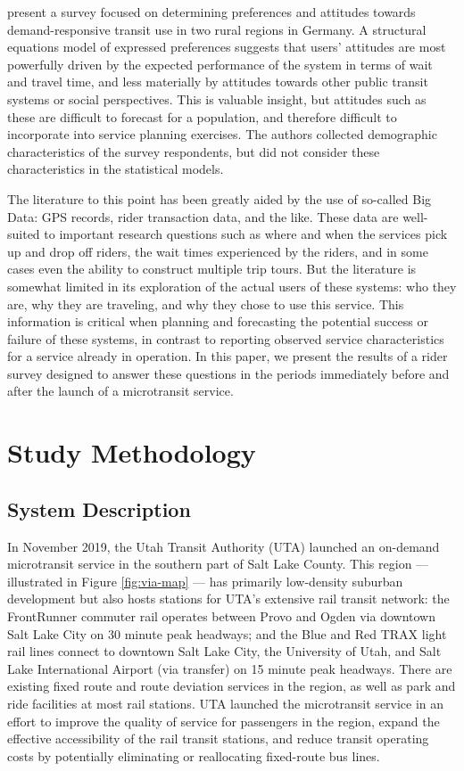 \documentclass[smartcities,article,submit,moreauthors,pdftex]{Definitions/mdpi}
\begin{document}
\citet{KONIG2020954} present a survey focused on determining preferences and attitudes towards demand-responsive transit use in two rural regions in Germany. A structural equations model of expressed preferences suggests that users' attitudes are most powerfully driven by the expected performance of the system in terms of wait and travel time, and less materially by attitudes towards other public transit systems or social perspectives. This is valuable insight, but attitudes such as these are difficult to forecast for a population, and therefore difficult to incorporate into service planning exercises. The authors collected demographic characteristics of the survey respondents, but did not consider these characteristics in the statistical models.

The literature to this point has been greatly aided by the use of so-called Big Data: GPS records, rider transaction data, and the like. These data are well-suited to important research questions such as where and when the services pick up and drop off riders, the wait times experienced by the riders, and in some cases even the ability to construct multiple trip tours. But the literature is somewhat limited in its exploration of the actual users of these systems: who they are, why they are traveling, and why they chose to use this service. This information is critical when planning and forecasting the potential success or failure of these systems, in contrast to reporting observed service characteristics for a service already in operation. In this paper, we present the results of a rider survey designed to answer these questions in the periods immediately before and after the launch of a microtransit service.

\section{Study Methodology}
\subsection{System Description}

In November 2019, the Utah Transit Authority (UTA) launched an on-demand microtransit service in the southern part of Salt Lake County. This region --- illustrated in Figure \ref{fig:via-map} --- has primarily low-density suburban development but also hosts stations for UTA's extensive rail transit network: the FrontRunner commuter rail operates between Provo and Ogden via downtown Salt Lake City on 30 minute peak headways; and the Blue and Red TRAX light rail lines connect to downtown Salt Lake City, the University of Utah, and Salt Lake International Airport (via transfer) on 15 minute peak headways. There are existing fixed route and route deviation services in the region, as well as park and ride facilities at most rail stations. UTA launched the microtransit service in an effort to improve the quality of service for passengers in the region, expand the effective accessibility of the rail transit stations, and reduce transit operating costs by potentially eliminating or reallocating fixed-route bus lines.
\end{document}
